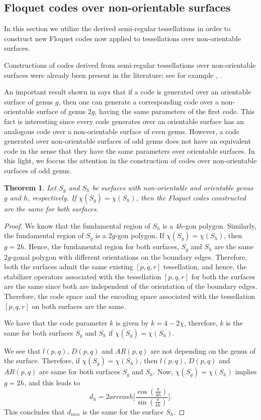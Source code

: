 \documentclass[%
reprint,
amsmath,amssymb,
aps,
]{revtex4-2}
\newtheorem{theorem}{Theorem}[section]
\begin{document}
\subsection{Floquet codes over non-orientable surfaces}\label{subNOFloquet}


In this section we utilize the derived semi-regular tessellations in order to construct new Floquet codes now applied to tessellations over non-orientable surfaces.

Constructions of codes derived from semi-regular tessellations over non-orientable surfaces were already been present in the literature; see for example \cite{Douglas1}, \cite{norientavel}. 

An important result shown in \cite{norientavel} says that if a code is generated over an orientable surface of genus $g$, then one can generate a corresponding code over a non-orientable surface of genus $2g$, having the same parameters of the first code. This fact is interesting since every code generates over an orientable surface has an analogous code over a non-orientable surface of even genus. However, a code generated over non-orientable surfaces of odd genus does not have an equivalent code in the sense that they have the same parameters over orientable surfaces. In this light, we foccus the attention in the construction of codes over non-orientable surfaces of odd genus.

\begin{theorem}\label{or_same_non_or_qcc}
	Let $S_{g}$ and $S_{h}$ be surfaces with non-orientable and orientable genus $g$ and $ h $, respectively. If $\chi(S_{g}) = \chi(S_{h})$, then the Floquet codes constructed are the same for both surfaces. 
\end{theorem}

\begin{proof}
	We know that the fundamental region of $S_{h}$ is a $4h$-gon polygon. Similarly, the fundamental region of $S_g$ is a $2g$-gon polygon. If $\chi(S_{g}) = \chi(S_{h})$, then $g=2h$. Hence, the fundamental region for both surfaces, $S_g$ and $S_h$ are the same $2g$-gonal polygon with different orientations on the boundary edges. Therefore, both the surfaces admit the same existing $[p,q,r]$ tessellation, and hence, the stabilizer operators associated with the tessellation $[p,q,r]$ for both the surfaces are the same since both are independent of the orientation of the boundary edges. Therefore, the code space and the encoding space associated with the tessellation $[p,q,r]$ on both surfaces are the same.
	
	We have that the code parameter $k$ is given by $k=4-2\chi$, therefore, $k$ is the same for both surfaces $S_g$ and $S_{h}$ if $\chi(S_g)=\chi(S_{h})$.
	
	We see that $l(p,q)$, $D(p,q)$ and $AR(p,q)$ are not depending on the genus of the surface. Therefore, if $\chi(S_g)= \chi(S_{h})$, then $l(p,q)$, $D(p,q)$ and $AR(p,q)$ are same for both surfaces $S_g$ and $S_{h}$. Now, $\chi(S_g)=  \chi(S_{h})$ implies $g=2h$, and this leads to
	\[
	d_h=2arccosh\Bigg[\frac{\cos{(\frac{\pi}{4h})}}{\sin{(\frac{\pi}{4h})}}\bigg].
	\]
	This concludes that $d_{min}$ is the same for the surface $S_{h}$.
\end{proof}
\end{document}
